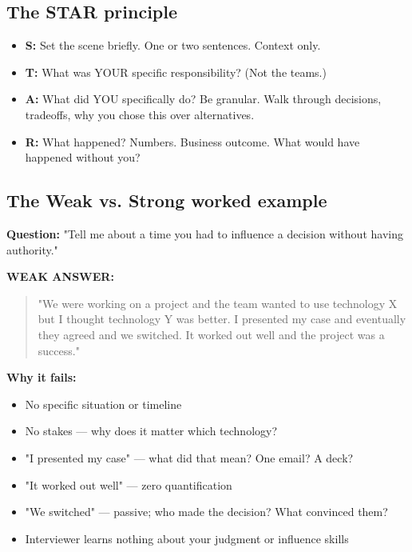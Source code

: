 \documentclass[11pt]{article}
\providecommand{\tightlist}{\setlength{\itemsep}{1pt}\setlength{\parskip}{0pt}}
\begin{document}
\subsection{The STAR principle}\label{the-star-principle}

\begin{itemize}
\tightlist
\item
  \textbf{S:} Set the scene briefly. One or two sentences. Context only.
\item
  \textbf{T:} What was YOUR specific responsibility? (Not the team\textquotesingle s.)
\item
  \textbf{A:} What did YOU specifically do? Be granular. Walk through decisions, tradeoffs, why you chose this over alternatives.
\item
  \textbf{R:} What happened? Numbers. Business outcome. What would have happened without you?
\end{itemize}

\subsection{The Weak vs. Strong worked example}\label{the-weak-vs-strong-worked-example}

\textbf{Question:} "Tell me about a time you had to influence a decision without having authority."

\textbf{WEAK ANSWER:}

\begin{quote}
"We were working on a project and the team wanted to use technology X but I thought technology Y was better. I presented my case and eventually they agreed and we switched. It worked out well and the project was a success."
\end{quote}

\textbf{Why it fails:}

\begin{itemize}
\tightlist
\item
  No specific situation or timeline
\item
  No stakes --- why does it matter which technology?
\item
  "I presented my case" --- what did that mean? One email? A deck?
\item
  "It worked out well" --- zero quantification
\item
  "We switched" --- passive; who made the decision? What convinced them?
\item
  Interviewer learns nothing about your judgment or influence skills
\end{itemize}
\end{document}
